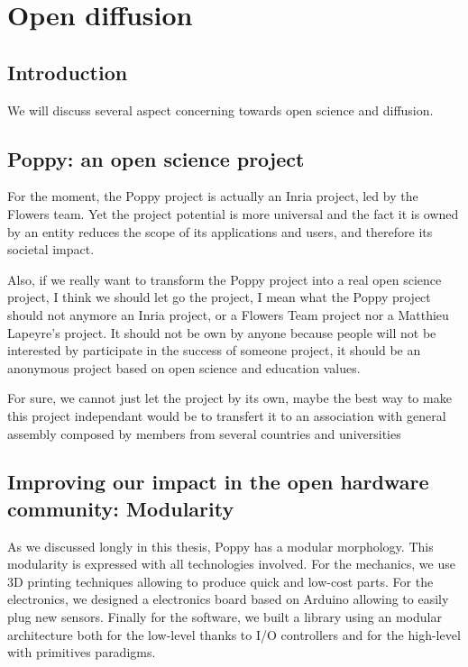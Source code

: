 \chapter{Open diffusion} %


\section{Introduction} %



We will discuss several aspect concerning towards open science and diffusion.




\section{Poppy: an open science project}

For the moment, the Poppy project is actually an Inria project, led by the Flowers team. Yet the project potential is more universal and the fact it is owned by an entity reduces the scope of its applications and users, and therefore its societal impact.


Also, if we really want to transform the Poppy project into a real open science project, I think we should let go the project, I mean what the Poppy project should not anymore an Inria project, or a Flowers Team project nor a Matthieu Lapeyre's project. It should not be own by anyone because people will not be interested by participate in the success of someone project, it should be an anonymous project based on open science and education values.


For sure, we cannot just let the project by its own, maybe the best way to make this project independant would be to transfert it to an association with general assembly composed by members from several countries and universities



\section{Improving our impact in the open hardware community: Modularity} %

As we discussed longly in this thesis, Poppy has a modular morphology. This modularity is expressed with all technologies involved. For the mechanics, we use 3D printing techniques allowing to produce quick and low-cost parts. For the electronics, we designed a electronics board based on Arduino allowing to easily plug new sensors. Finally for the software, we built a library using an modular architecture both for the low-level thanks to I/O controllers and for the high-level with primitives paradigms.

